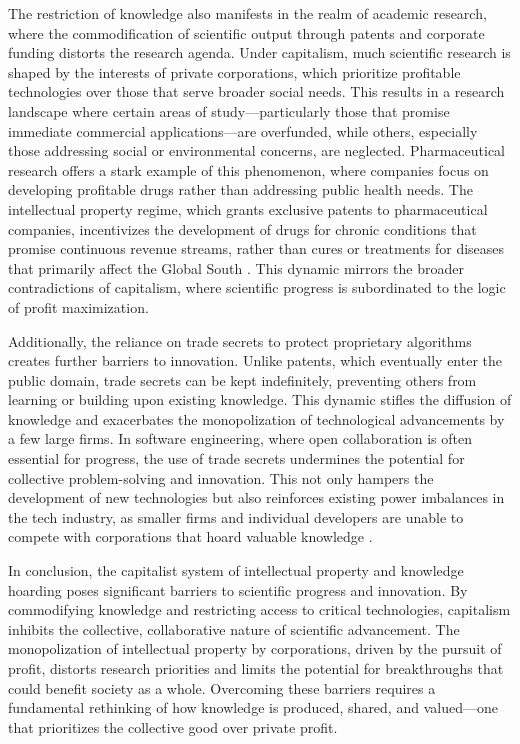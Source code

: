 \begin{refsection}
The restriction of knowledge also manifests in the realm of academic research, where the commodification of scientific output through patents and corporate funding distorts the research agenda. Under capitalism, much scientific research is shaped by the interests of private corporations, which prioritize profitable technologies over those that serve broader social needs. This results in a research landscape where certain areas of study—particularly those that promise immediate commercial applications—are overfunded, while others, especially those addressing social or environmental concerns, are neglected. Pharmaceutical research offers a stark example of this phenomenon, where companies focus on developing profitable drugs rather than addressing public health needs. The intellectual property regime, which grants exclusive patents to pharmaceutical companies, incentivizes the development of drugs for chronic conditions that promise continuous revenue streams, rather than cures or treatments for diseases that primarily affect the Global South \cite[pp.~45-47]{angell2004}. This dynamic mirrors the broader contradictions of capitalism, where scientific progress is subordinated to the logic of profit maximization.

Additionally, the reliance on trade secrets to protect proprietary algorithms creates further barriers to innovation. Unlike patents, which eventually enter the public domain, trade secrets can be kept indefinitely, preventing others from learning or building upon existing knowledge. This dynamic stifles the diffusion of knowledge and exacerbates the monopolization of technological advancements by a few large firms. In software engineering, where open collaboration is often essential for progress, the use of trade secrets undermines the potential for collective problem-solving and innovation. This not only hampers the development of new technologies but also reinforces existing power imbalances in the tech industry, as smaller firms and individual developers are unable to compete with corporations that hoard valuable knowledge \cite[pp.~76-79]{mazzucato2018}.

In conclusion, the capitalist system of intellectual property and knowledge hoarding poses significant barriers to scientific progress and innovation. By commodifying knowledge and restricting access to critical technologies, capitalism inhibits the collective, collaborative nature of scientific advancement. The monopolization of intellectual property by corporations, driven by the pursuit of profit, distorts research priorities and limits the potential for breakthroughs that could benefit society as a whole. Overcoming these barriers requires a fundamental rethinking of how knowledge is produced, shared, and valued—one that prioritizes the collective good over private profit.


\end{refsection}
